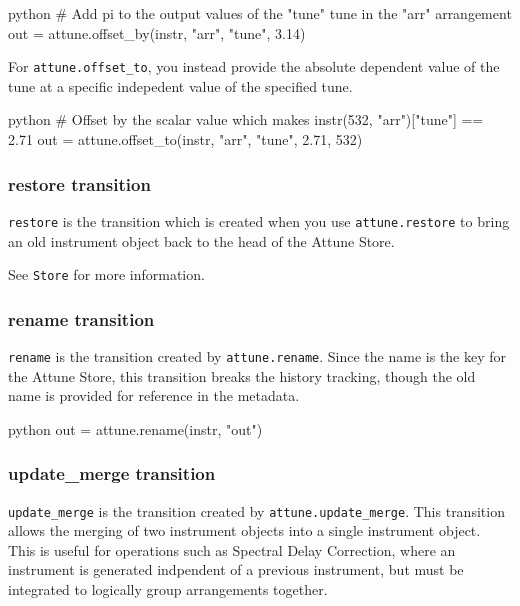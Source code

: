 \begin{codefragment}{python}
# Add pi to the output values of the "tune" tune in the "arr" arrangement
out = attune.offset_by(instr, "arr", "tune", 3.14)
\end{codefragment}

For \texttt{attune.offset\_to}, you instead provide the absolute
dependent value of the tune at a specific indepedent value of the
specified tune.

\begin{codefragment}{python}
# Offset by the scalar value which makes instr(532, "arr")["tune"] == 2.71
out = attune.offset_to(instr, "arr", "tune", 2.71, 532)
\end{codefragment}

\hypertarget{restore-transition}{%
\subsubsection{restore transition}\label{restore-transition}}

\texttt{restore} is the transition which is created when you use
\texttt{attune.restore} to bring an old instrument object back to the
head of the Attune Store.

See \texttt{Store} for more information.

\hypertarget{rename-transition}{%
\subsubsection{rename transition}\label{rename-transition}}

\texttt{rename} is the transition created by \texttt{attune.rename}.
Since the name is the key for the Attune Store, this transition breaks
the history tracking, though the old name is provided for reference in
the metadata.

\begin{codefragment}{python}
out = attune.rename(instr, "out")
\end{codefragment}

\hypertarget{update_merge-transition}{%
\subsubsection{update\_merge transition}\label{update_merge-transition}}

\texttt{update\_merge} is the transition created by
\texttt{attune.update\_merge}. This transition allows the merging of two
instrument objects into a single instrument object. This is useful for
operations such as Spectral Delay Correction, where an instrument is
generated indpendent of a previous instrument, but must be integrated to
logically group arrangements together.


